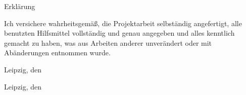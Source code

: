 \thispagestyle{empty}
\begin{center}
\large \lsstyle Erklärung
\end{center}
\vspace{1.5cm}
{\doublespacing
Ich versichere wahrheitsgemäß, die Projektarbeit selbständig angefertigt, alle benutzten Hilfsmittel vollständig und genau angegeben und alles kenntlich gemacht zu haben, was aus Arbeiten anderer unverändert oder mit Abänderungen entnommen wurde.}\par
\vspace{2cm}
\noindent
\begin{minipage}[t]{6.5cm}
\dotfill

\onehalfspacing
\autor

Leipzig, den \datum
\end{minipage}\par
\vspace{2.5cm}

\begin{minipage}[t]{6.5cm}
\dotfill

\onehalfspacing
\autorII

Leipzig, den \datum
\end{minipage}\par
\vspace{2.5cm}

\iffalse %

\begin{minipage}[t]{6.5cm}
\dotfill

\onehalfspacing
\autorIII

Leipzig, den \datum
\end{minipage}\par

\fi %

\clearpage
